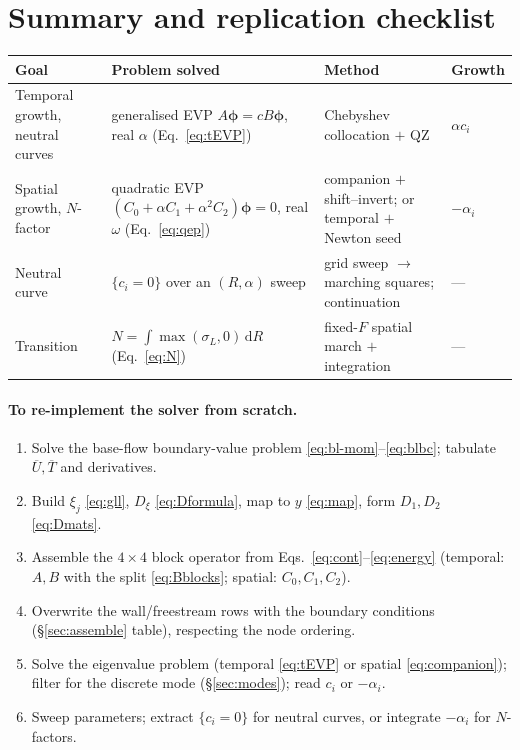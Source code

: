 \documentclass[11pt]{article}
\renewcommand{\bar}[1]{\overline{#1}}
\begin{document}
\section{Summary and replication checklist}\label{sec:summary}
\begin{center}\small
\renewcommand{\arraystretch}{1.25}
\begin{tabular}{@{}>{\raggedright\arraybackslash}p{2.7cm}>{\raggedright\arraybackslash}p{4.6cm}
>{\raggedright\arraybackslash}p{4.4cm}>{\raggedright\arraybackslash}p{2.4cm}@{}}
\toprule
\textbf{Goal} & \textbf{Problem solved} & \textbf{Method} & \textbf{Growth} \\
\midrule
Temporal growth, neutral curves
  & generalised EVP $A\boldsymbol\phi=cB\boldsymbol\phi$, real $\alpha$ (Eq.~\ref{eq:tEVP})
  & Chebyshev collocation $+$ QZ & $\alpha c_i$ \\
Spatial growth, $N$-factor
  & quadratic EVP $(C_0+\alpha C_1+\alpha^2C_2)\boldsymbol\phi=0$, real $\omega$ (Eq.~\ref{eq:qep})
  & companion $+$ shift--invert; or temporal $+$ Newton seed & $-\alpha_i$ \\
Neutral curve
  & $\{c_i=0\}$ over an $(R,\alpha)$ sweep
  & grid sweep $\to$ marching squares; continuation & --- \\
Transition
  & $N=\int\max(\sigma_L,0)\,\mathrm dR$ (Eq.~\ref{eq:N})
  & fixed-$F$ spatial march $+$ integration & --- \\
\bottomrule
\end{tabular}
\end{center}

\paragraph{To re-implement the solver from scratch.}
\begin{enumerate}[nosep,leftmargin=1.9em]
  \item Solve the base-flow boundary-value problem \eqref{eq:bl-mom}--\eqref{eq:blbc}; tabulate $\bar U,\bar T$ and derivatives.
  \item Build $\xi_j$ \eqref{eq:gll}, $D_\xi$ \eqref{eq:Dformula}, map to $y$ \eqref{eq:map}, form $D_1,D_2$ \eqref{eq:Dmats}.
  \item Assemble the $4\times4$ block operator from Eqs.~\eqref{eq:cont}--\eqref{eq:energy} (temporal: $A,B$ with the split \eqref{eq:Bblocks}; spatial: $C_0,C_1,C_2$).
  \item Overwrite the wall/freestream rows with the boundary conditions (\S\ref{sec:assemble} table), respecting the node ordering.
  \item Solve the eigenvalue problem (temporal \eqref{eq:tEVP} or spatial \eqref{eq:companion}); filter for the discrete mode (\S\ref{sec:modes}); read $c_i$ or $-\alpha_i$.
  \item Sweep parameters; extract $\{c_i=0\}$ for neutral curves, or integrate $-\alpha_i$ for $N$-factors.
\end{enumerate}
\end{document}
